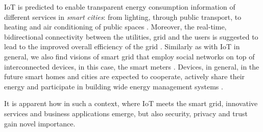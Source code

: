 IoT is predicted to enable transparent energy consumption information of different services in \textit{smart cities}: from lighting, through public transport, to heating and air conditioning of public spaces \cite{zanella2014internet}. Moreover, the real-time, bidirectional connectivity between the utilities, grid and the users is suggested to lead to the improved overall efficiency of the grid \cite{yun2010research,li2011applications}. Similarly as with IoT in general, we also find visions of smart grid that employ social networks on top of interconnected devices, in this case, the smart meters \cite{ciuciu2012social}. Devices, in general, in the future smart homes and cities are expected to cooperate, actively share their energy and participate in building wide energy management systems \cite{karnouskos2010cooperative}. 

It is apparent how in such a context, where IoT meets the smart grid, innovative services and business applications emerge, but also security, privacy and trust gain novel importance.


